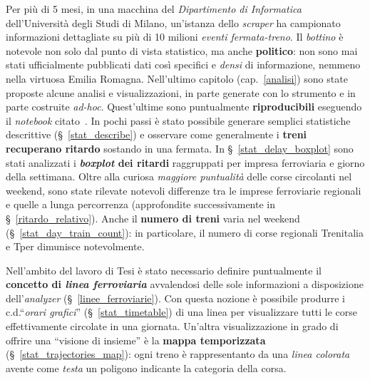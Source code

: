 \documentclass[12pt,italian]{report}
\begin{document}
Per più di 5 mesi, in una macchina del \textit{Dipartimento di
    Informatica} dell'Università degli Studi di Milano, un'istanza
dello \textit{scraper} ha campionato informazioni dettagliate su più
di 10 milioni \textit{eventi fermata-treno}.  Il \textit{bottino} è
notevole non solo dal punto di vista statistico, ma anche
\textbf{politico}: non sono mai stati ufficialmente pubblicati dati
così specifici e \textit{densi} di informazione, nemmeno nella
virtuosa Emilia Romagna.  Nell'ultimo capitolo (cap.\@~\ref{analisi})
sono state proposte alcune analisi e visualizzazioni, in parte
generate con lo strumento e in parte costruite \textit{ad-hoc}.
Quest'ultime sono puntualmente \textbf{riproducibili} eseguendo il
\textit{notebook} citato~\cite{StatJup}.  In pochi passi è stato
possibile generare semplici statistiche descrittive
(\S~\ref{stat_describe}) e osservare come generalmente i \textbf{treni
    recuperano ritardo} sostando in una fermata.  In
\S~\ref{stat_delay_boxplot} sono stati analizzati i
\textbf{\textit{boxplot} dei ritardi} raggruppati per impresa
ferroviaria e giorno della settimana.  Oltre alla curiosa
\textit{maggiore puntualità} delle corse circolanti nel weekend, sono
state rilevate notevoli differenze tra le imprese ferroviarie
regionali e quelle a lunga percorrenza (approfondite successivamente
in \S~\ref{ritardo_relativo}).  Anche il \textbf{numero di treni}
varia nel weekend (\S~\ref{stat_day_train_count}): in particolare, il
numero di corse regionali Trenitalia e Tper dimunisce notevolmente.

Nell'ambito del lavoro di Tesi è stato necessario definire
puntualmente il \textbf{concetto di \textit{linea ferroviaria}}
avvalendosi delle sole informazioni a disposizione
dell'\textit{analyzer} (\S~\ref{linee_ferroviarie}).  Con questa
nozione è possibile produrre i c.d.\@ ``\textit{orari grafici}''
(\S~\ref{stat_timetable}) di una linea per visualizzare tutti le corse
effettivamente circolate in una giornata.  Un'altra visualizzazione in
grado di offrire una ``visione di insieme'' è la \textbf{mappa
    temporizzata} (\S~\ref{stat_trajectories_map}): ogni treno è
rappresentanto da una \textit{linea colorata} avente come
\textit{testa} un poligono indicante la categoria della corsa.
\end{document}
